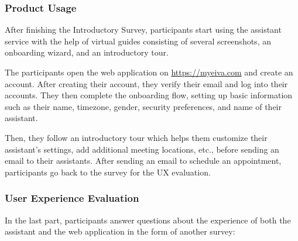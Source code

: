 \documentclass{article}
\begin{document}
\subsubsection{Product Usage}

After finishing the Introductory Survey, participants start using the assistant service with the help of virtual guides consisting of several screenshots, an onboarding wizard, and an introductory tour.

The participants open the web application on \url{https://myeiva.com} and create an account. After creating their account, they verify their email and log into their accounts. They then complete the onboarding flow, setting up basic information such as their name, timezone, gender, security preferences, and name of their assistant.

Then, they follow an introductory tour which helps them customize their assistant's settings, add additional meeting locations, etc., before sending an email to their assistants. After sending an email to schedule an appointment, participants go back to the survey for the UX evaluation.

\subsubsection{User Experience Evaluation}

In the last part, participants answer questions about the experience of both the assistant and the web application in the form of another survey:
\end{document}
